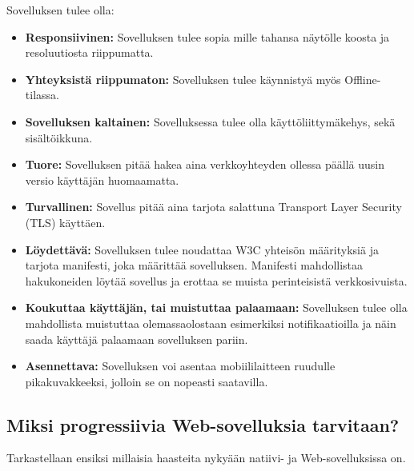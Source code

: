 \documentclass{tktltiki}
\begin{document}
Sovelluksen tulee olla:
\begin{itemize}
  \item \textbf{Responsiivinen:} Sovelluksen tulee sopia mille tahansa näytölle koosta ja resoluutiosta riippumatta.
  \item \textbf{Yhteyksistä riippumaton:} Sovelluksen tulee käynnistyä myös Offline-tilassa.
  \item \textbf{Sovelluksen kaltainen:} Sovelluksessa tulee olla käyttöliittymäkehys, sekä sisältöikkuna.
  \item \textbf{Tuore:} Sovelluksen pitää hakea aina verkkoyhteyden ollessa päällä uusin versio käyttäjän huomaamatta.
  \item \textbf{Turvallinen:} Sovellus pitää aina tarjota salattuna Transport Layer Security (TLS) käyttäen.
  \item \textbf{Löydettävä:} Sovelluksen tulee noudattaa W3C yhteisön määrityksiä ja tarjota manifesti, joka määrittää sovelluksen. Manifesti mahdollistaa hakukoneiden löytää sovellus ja erottaa se muista perinteisistä verkkosivuista.
  \item \textbf{Koukuttaa käyttäjän, tai muistuttaa palaamaan:} Sovelluksen tulee olla mahdollista muistuttaa olemassaolostaan esimerkiksi notifikaatioilla ja näin saada käyttäjä palaamaan sovelluksen pariin.
  \item \textbf{Asennettava:} Sovelluksen voi asentaa mobiililaitteen ruudulle pikakuvakkeeksi, jolloin se on nopeasti saatavilla.
\end{itemize}

\subsection{Miksi progressiivia Web-sovelluksia tarvitaan?}
\enlargethispage{5mm}

Tarkastellaan ensiksi millaisia haasteita nykyään natiivi- ja Web-sovelluksissa on.
\end{document}
